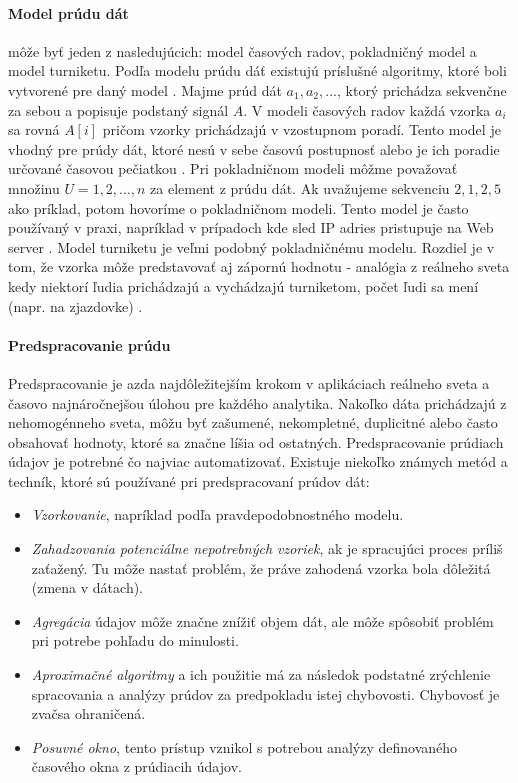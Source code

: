 \paragraph{Model prúdu dát} môže byť jeden z nasledujúcich: model časových radov, pokladničný model a model turniketu. Podľa modelu prúdu dáť existujú príslušné algoritmy, ktoré boli vytvorené pre daný model \citep{tran2014change}. Majme prúd dát $a_1, a_2, ...$, ktorý prichádza sekvenčne za sebou a popisuje podstaný signál $A$. 
V modeli časových radov každá vzorka $a_i$ sa rovná $A[i]$ pričom vzorky prichádzajú v vzostupnom poradí. Tento model je vhodný pre prúdy dát, ktoré nesú v sebe časovú postupnosť alebo je ich poradie určované časovou pečiatkou \citep{muthukrishnan2005data}.
Pri pokladničnom modeli môžme považovať množinu $U = {1, 2, ..., n}$ za element z prúdu dát. Ak uvažujeme sekvenciu $2, 1, 2, 5$ ako príklad, potom hovoríme o pokladničnom modeli. Tento model je často používaný v praxi, napríklad v prípadoch kde sled IP adries pristupuje na Web server \citep{ikonomovska2013algorithmic, muthukrishnan2005data}.
Model turniketu je veľmi podobný pokladničnému modelu. Rozdiel je v tom, že vzorka môže predstavovať aj zápornú hodnotu - analógia z reálneho sveta kedy niektorí ľudia prichádzajú a vychádzajú turniketom, počet ľudi sa mení (napr. na zjazdovke) \citep{ikonomovska2013algorithmic, muthukrishnan2005data}.

\paragraph{Predspracovanie prúdu}
Predspracovanie je azda najdôležitejším krokom v aplikáciach reálneho sveta a časovo najnáročnejšou úlohou pre každého analytika. Nakoľko dáta prichádzajú z nehomogénneho sveta, môžu byť zašumené, nekompletné, duplicitné alebo často obsahovať hodnoty, ktoré sa značne líšia od ostatných. Predspracovanie prúdiach údajov je potrebné čo najviac automatizovať. Existuje niekoľko známych metód a techník, ktoré sú používané pri predspracovaní prúdov dát:
\begin{itemize}
	\item \textit{Vzorkovanie}, napríklad podľa pravdepodobnostného modelu.
	\item \textit{Zahadzovania potenciálne nepotrebných vzoriek}, ak je spracujúci proces príliš zaťažený. Tu môže nastať problém, že práve zahodená vzorka bola dôležitá (zmena v dátach).
	\item \textit{Agregácia} údajov môže značne znížiť objem dát, ale môže spôsobiť problém pri potrebe pohľadu do minulosti.
	\item \textit{Aproximačné algoritmy} a ich použitie má za následok podstatné zrýchlenie spracovania a analýzy prúdov za predpokladu istej chybovosti. Chybovosť je zvačsa ohraničená.
	\item \textit{Posuvné okno}, tento prístup vznikol s potrebou analýzy definovaného časového okna z prúdiacih údajov.
\end{itemize}

